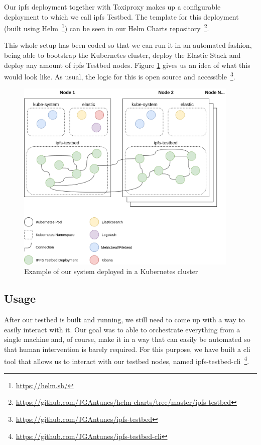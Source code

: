 Our \acrshort{ipfs} deployment together with Toxiproxy makes up a configurable deployment
to which we call \acrshort{ipfs} Testbed. The template for this deployment (built using
Helm~\footnote{\url{https://helm.sh/}}) can be seen in our Helm Charts
repository~\footnote{\url{https://github.com/JGAntunes/helm-charts/tree/master/ipfs-testbed}}.

This whole setup has been coded so that we can run it in an automated fashion,
being able to bootstrap the Kubernetes cluster, deploy the Elastic Stack and
deploy any amount of \acrshort{ipfs} Testbed nodes. Figure
\ref{fig:ipfs-testbed-kubernetes-overview} gives us an idea of what this would
look like. As usual, the logic for this is open source and
accessible~\footnote{\url{https://github.com/JGAntunes/ipfs-testbed}}.

\begin{figure}[!htb]
  \centering
  \includegraphics[width=0.95\textwidth]{../images/ipfs-testbed-kubernetes-overview.png}
  \caption{Example of our system deployed in a Kubernetes cluster}
  \label{fig:ipfs-testbed-kubernetes-overview}
\end{figure}

\subsection{Usage}\label{subsec:testbed-usage}

After our testbed is built and running, we still need to come up with a way to
easily interact with it. Our goal was to able to orchestrate everything from a
single machine and, of course, make it in a way that can easily be automated so
that human intervention is barely required. For this purpose, we have built a
\acrshort{cli} tool that allows us to interact with our testbed nodes, named
ipfs-testbed-cli~\footnote{\url{https://github.com/JGAntunes/ipfs-testbed-cli}}. 

